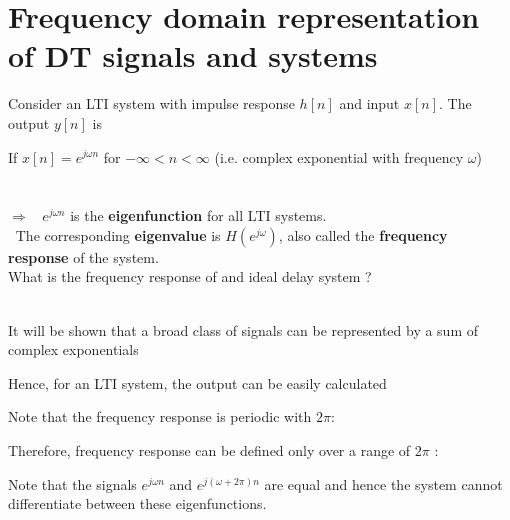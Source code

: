 \documentclass[10pt,a4paper,report]{report}       %
\newcommand{\om}{\omega}
\begin{document}
\section{Frequency domain representation of DT signals and systems}
Consider an LTI system with impulse response $h[n]$ and input $x[n]$. The output $y[n]$ is \\ \vspace{1.5cm}

If $x[n]=e^{j\om n}$ for $-\infty < n < \infty$ (i.e. complex exponential with frequency $\om$) \\ 
\vspace{1.5cm}\\
\vspace{3cm}\\
$\Longrightarrow$ \textbullet $~$ $e^{j\om n}$ is the \textbf{eigenfunction} for all LTI systems.\\
\hspace*{0.71cm}  \textbullet $~$ The corresponding \textbf{eigenvalue} is $H(e^{j\om})$, also called the \textbf{frequency response} of the system.\\

\ex What is the frequency response of and ideal delay system ?\\
\vspace{2cm}\\
\vspace{2cm}

It will be shown that a broad class of signals can be represented by a sum of complex exponentials\\
\vspace{1.0cm}

Hence, for an LTI system, the output can be easily calculated\\
\vspace{1.5cm}

Note that the frequency response is periodic with $2\pi$: \\ 
\vspace{0.5cm}%

Therefore, frequency response can be defined only over a range of $2\pi$ :\\
\vspace{0.5cm}

Note that the signals $e^{j\om n}$ and $e^{j(\om +2\pi)n}$ are equal and hence the system cannot differentiate between these eigenfunctions.\\
\end{document}
